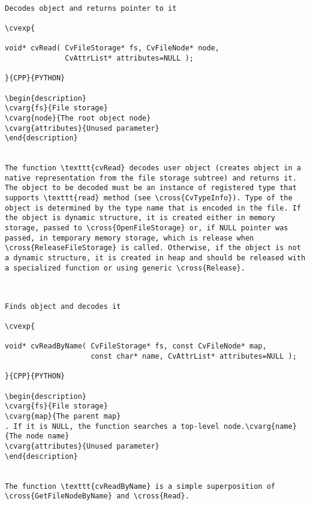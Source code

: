\begin{verbatim}

Decodes object and returns pointer to it

\cvexp{

void* cvRead( CvFileStorage* fs, CvFileNode* node,
              CvAttrList* attributes=NULL );

}{CPP}{PYTHON}

\begin{description}
\cvarg{fs}{File storage}
\cvarg{node}{The root object node}
\cvarg{attributes}{Unused parameter}
\end{description}


The function \texttt{cvRead} decodes user object (creates object in a native representation from the file storage subtree) and returns it. The object to be decoded must be an instance of registered type that supports \texttt{read} method (see \cross{CvTypeInfo}). Type of the object is determined by the type name that is encoded in the file. If the object is dynamic structure, it is created either in memory storage, passed to \cross{OpenFileStorage} or, if NULL pointer was passed, in temporary memory storage, which is release when \cross{ReleaseFileStorage} is called. Otherwise, if the object is not a dynamic structure, it is created in heap and should be released with a specialized function or using generic \cross{Release}.


\end{verbatim}
\begin{verbatim}

Finds object and decodes it

\cvexp{

void* cvReadByName( CvFileStorage* fs, const CvFileNode* map,
                    const char* name, CvAttrList* attributes=NULL );

}{CPP}{PYTHON}

\begin{description}
\cvarg{fs}{File storage}
\cvarg{map}{The parent map}
. If it is NULL, the function searches a top-level node.\cvarg{name}{The node name}
\cvarg{attributes}{Unused parameter}
\end{description}


The function \texttt{cvReadByName} is a simple superposition of \cross{GetFileNodeByName} and \cross{Read}.


\end{verbatim}
